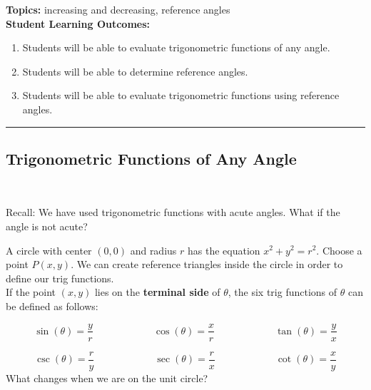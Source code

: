 

\noindent \textbf{Topics:}  increasing and decreasing, reference angles\\

\noindent \textbf{Student Learning Outcomes:}
\begin{enumerate}
\item Students will be able to evaluate trigonometric functions of any angle.
\item Students will be able to determine reference angles.
\item Students will be able to evaluate trigonometric functions using reference angles.
\end{enumerate}

\hrule 

\bigskip

\subsection{Trigonometric Functions of Any Angle} ~

\noindent  Recall:  We have used trigonometric functions with acute angles.  What if the angle is not acute?\vfill

\noindent A circle with center $(0,0)$ and radius $r$ has the equation $x^2+y^2=r^2$.  Choose a point $P(x,y)$.  We can create reference triangles inside the circle in order to define our trig functions.\\[2.5in]


\noindent If the point $(x,y)$ lies on the \textbf{terminal side} of $\theta$, the six trig functions of $\theta$ can be defined as follows:

$$\sin(\theta)=\frac{y}{r} \quad \quad \quad \quad \quad \quad \cos(\theta)=\frac{x}{r} \quad \quad \quad \quad \quad \quad \tan(\theta)=\frac{y}{x} $$

$$\csc(\theta)=\frac{r}{y} \quad \quad \quad \quad \quad \quad \sec(\theta)=\frac{r}{x} \quad \quad \quad \quad \quad \quad \cot(\theta)=\frac{x}{y} $$
\vfill
\noindent What changes when we are on the unit circle?



\newpage



